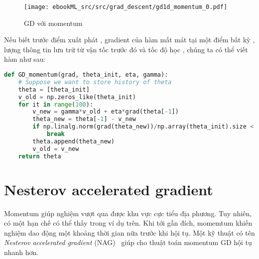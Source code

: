 \begin{figure}[t]
\centering
\texttt{[image: ebookML\_src/src/grad\_descent/gd1d\_momentum\_0.pdf]}
\caption[]{GD với momentum}
\label{fig:8_momen}
\end{figure}




Nếu biết trước điểm xuất phát , gradient của hàm mất mát tại
một điểm bất kỳ , lượng thông tin lưu trữ từ vận tốc
trước đó  và tốc độ học , chúng ta có thể
viết hàm  như sau:%
\newpage
\begin{lstlisting}[language=Python]
def GD_momentum(grad, theta_init, eta, gamma):
    # Suppose we want to store history of theta
    theta = [theta_init]
    v_old = np.zeros_like(theta_init)
    for it in range(100):
        v_new = gamma*v_old + eta*grad(theta[-1])
        theta_new = theta[-1] - v_new
        if np.linalg.norm(grad(theta_new))/np.array(theta_init).size < 1e-3:
            break
        theta.append(theta_new)
        v_old = v_new
    return theta
\end{lstlisting}


\section{Nesterov accelerated gradient}
Momentum giúp nghiệm vượt qua được khu vực cực tiểu địa phương. Tuy nhiên, có
một hạn chế có thể thấy trong ví dụ trên. Khi tới gần đích, momemtum khiến
nghiệm dao động một khoảng thời gian nữa trước khi hội tụ. Một kỹ thuật có tên
\textit{Nesterov accelerated gradient} (NAG)~\cite{nesterov2007gradient} giúp
cho thuật toán momentum GD hội tụ nhanh hơn.

